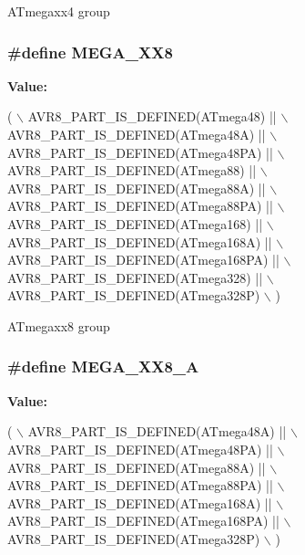 A\-Tmegaxx4 group \hypertarget{group__mega__part__macros__group_ga47583caa82990781cd23a8495710ef31}{
\subsubsection[{M\-E\-G\-A\-\_\-\-X\-X8}]{\setlength{\rightskip}{0pt plus 5cm}\#define M\-E\-G\-A\-\_\-\-X\-X8}}\label{group__mega__part__macros__group_ga47583caa82990781cd23a8495710ef31}
{\bfseries Value\-:}
\begin{DoxyCode}
( \(\backslash\)
        AVR8\_PART\_IS\_DEFINED(ATmega48)    || \(\backslash\)
        AVR8\_PART\_IS\_DEFINED(ATmega48A)   || \(\backslash\)
        AVR8\_PART\_IS\_DEFINED(ATmega48PA)  || \(\backslash\)
        AVR8\_PART\_IS\_DEFINED(ATmega88)    || \(\backslash\)
        AVR8\_PART\_IS\_DEFINED(ATmega88A)   || \(\backslash\)
        AVR8\_PART\_IS\_DEFINED(ATmega88PA)  || \(\backslash\)
        AVR8\_PART\_IS\_DEFINED(ATmega168)   || \(\backslash\)
        AVR8\_PART\_IS\_DEFINED(ATmega168A)  || \(\backslash\)
        AVR8\_PART\_IS\_DEFINED(ATmega168PA) || \(\backslash\)
        AVR8\_PART\_IS\_DEFINED(ATmega328)   || \(\backslash\)
        AVR8\_PART\_IS\_DEFINED(ATmega328P) \(\backslash\)
        )
\end{DoxyCode}
A\-Tmegaxx8 group \hypertarget{group__mega__part__macros__group_gadb4a50447f658e564b640ca248e85b51}{
\subsubsection[{M\-E\-G\-A\-\_\-\-X\-X8\-\_\-\-A}]{\setlength{\rightskip}{0pt plus 5cm}\#define M\-E\-G\-A\-\_\-\-X\-X8\-\_\-\-A}}\label{group__mega__part__macros__group_gadb4a50447f658e564b640ca248e85b51}
{\bfseries Value\-:}
\begin{DoxyCode}
( \(\backslash\)
        AVR8\_PART\_IS\_DEFINED(ATmega48A)   || \(\backslash\)
        AVR8\_PART\_IS\_DEFINED(ATmega48PA)  || \(\backslash\)
        AVR8\_PART\_IS\_DEFINED(ATmega88A)   || \(\backslash\)
        AVR8\_PART\_IS\_DEFINED(ATmega88PA)  || \(\backslash\)
        AVR8\_PART\_IS\_DEFINED(ATmega168A)  || \(\backslash\)
        AVR8\_PART\_IS\_DEFINED(ATmega168PA) || \(\backslash\)
        AVR8\_PART\_IS\_DEFINED(ATmega328P) \(\backslash\)
        )
\end{DoxyCode}
